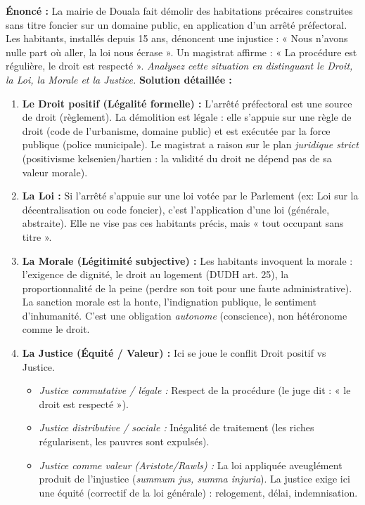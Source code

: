 \documentclass[11pt]{article}
\newcommand{\cle}[1]{{\popxbold\color{popdark}#1}}
\begin{document}
\begin{exoresolu}
    \textbf{Énoncé :} La mairie de Douala fait démolir des habitations précaires construites sans titre foncier sur un domaine public, en application d'un arrêté préfectoral. Les habitants, installés depuis 15 ans, dénoncent une injustice : « Nous n'avons nulle part où aller, la loi nous écrase ». Un magistrat affirme : « La procédure est régulière, le droit est respecté ». 
    \textit{Analysez cette situation en distinguant le Droit, la Loi, la Morale et la Justice.}
    \tcblower
    \textbf{Solution détaillée :}
    \begin{enumerate}
        \item \textbf{Le Droit positif (Légalité formelle) :} L'arrêté préfectoral est une source de droit (règlement). La démolition est \cle{légale} : elle s'appuie sur une règle de droit (code de l'urbanisme, domaine public) et est exécutée par la force publique (police municipale). Le magistrat a raison sur le plan \emph{juridique strict} (positivisme kelsenien/hartien : la validité du droit ne dépend pas de sa valeur morale).
        \item \textbf{La Loi :} Si l'arrêté s'appuie sur une loi votée par le Parlement (ex: Loi sur la décentralisation ou code foncier), c'est l'application d'une \cle{loi} (générale, abstraite). Elle ne vise pas ces habitants précis, mais « tout occupant sans titre ».
        \item \textbf{La Morale (Légitimité subjective) :} Les habitants invoquent la \cle{morale} : l'exigence de dignité, le droit au logement (DUDH art. 25), la proportionnalité de la peine (perdre son toit pour une faute administrative). La sanction morale est la honte, l'indignation publique, le sentiment d'inhumanité. C'est une obligation \emph{autonome} (conscience), non hétéronome comme le droit.
        \item \textbf{La Justice (Équité / Valeur) :} Ici se joue le conflit \cle{Droit positif vs Justice}. 
            \begin{itemize}
                \item \emph{Justice commutative / légale :} Respect de la procédure (le juge dit : « le droit est respecté »).
                \item \emph{Justice distributive / sociale :} Inégalité de traitement (les riches régularisent, les pauvres sont expulsés). 
                \item \emph{Justice comme valeur (Aristote/Rawls) :} La loi appliquée aveuglément produit de l'injustice (\emph{summum jus, summa injuria}). La justice exige ici une \cle{équité} (correctif de la loi générale) : relogement, délai, indemnisation.

\end{itemize}
\end{enumerate}
\end{exoresolu}
\end{document}
